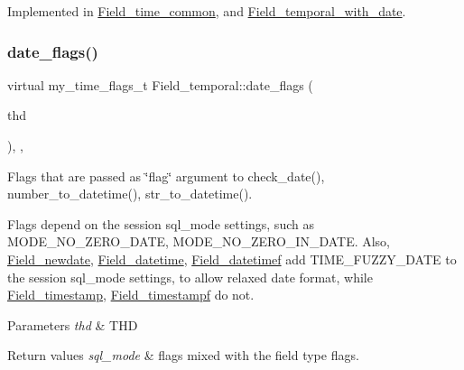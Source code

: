 Implemented in \mbox{\hyperlink{classField__time__common_acfef2451ff4e62d79823fec4c14750be}{Field\+\_\+time\+\_\+common}}, and \mbox{\hyperlink{classField__temporal__with__date_ae39fe9b7b0dbb013f52ce93551420886}{Field\+\_\+temporal\+\_\+with\+\_\+date}}.

\mbox{\label{classField__temporal_ac97041d80803a32c6fb9250bfa0c9200}} 
\subsubsection{\texorpdfstring{date\+\_\+flags()}{date\_flags()}\hspace{0.1cm}{\footnotesize\ttfamily [1/2]}}
{\footnotesize\ttfamily virtual my\+\_\+time\+\_\+flags\+\_\+t Field\+\_\+temporal\+::date\+\_\+flags (\begin{DoxyParamCaption}\item[{const T\+HD $\ast$}]{thd }\end{DoxyParamCaption})\hspace{0.3cm}{\ttfamily [inline]}, {\ttfamily [protected]}, {\ttfamily [virtual]}}

Flags that are passed as \char`\"{}flag\char`\"{} argument to check\+\_\+date(), number\+\_\+to\+\_\+datetime(), str\+\_\+to\+\_\+datetime().

Flags depend on the session sql\+\_\+mode settings, such as M\+O\+D\+E\+\_\+\+N\+O\+\_\+\+Z\+E\+R\+O\+\_\+\+D\+A\+TE, M\+O\+D\+E\+\_\+\+N\+O\+\_\+\+Z\+E\+R\+O\+\_\+\+I\+N\+\_\+\+D\+A\+TE. Also, \mbox{\hyperlink{classField__newdate}{Field\+\_\+newdate}}, \mbox{\hyperlink{classField__datetime}{Field\+\_\+datetime}}, \mbox{\hyperlink{classField__datetimef}{Field\+\_\+datetimef}} add T\+I\+M\+E\+\_\+\+F\+U\+Z\+Z\+Y\+\_\+\+D\+A\+TE to the session sql\+\_\+mode settings, to allow relaxed date format, while \mbox{\hyperlink{classField__timestamp}{Field\+\_\+timestamp}}, \mbox{\hyperlink{classField__timestampf}{Field\+\_\+timestampf}} do not.


\begin{DoxyParams}{Parameters}
{\em thd} & T\+HD \\
\hline
\end{DoxyParams}

\begin{DoxyRetVals}{Return values}
{\em sql\+\_\+mode} & flags mixed with the field type flags. \\
\hline
\end{DoxyRetVals}


